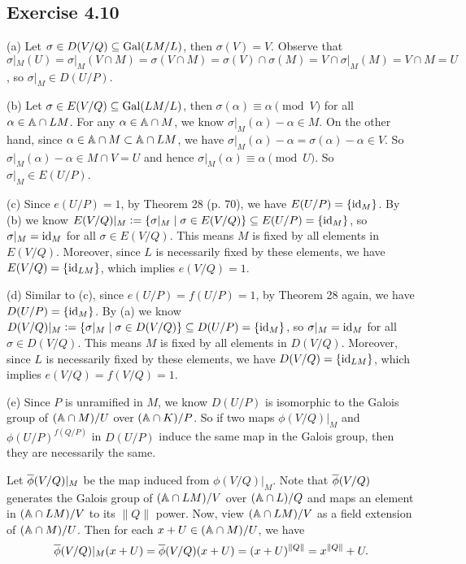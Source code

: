 \documentclass[../Marcus.tex]{subfiles}
\begin{document}
\subsection*{Exercise 4.10}

(a) Let $\sigma\in D(V/Q)\sbe\Gal(LM/L)$, then $\sigma(V)=V$. Observe that $\sigma|_M(U)=\sigma|_M(V\cap M)=\sigma(V\cap M)=\sigma(V)\cap\sigma(M)=V\cap\sigma|_M(M)=V\cap M=U$, so $\sigma|_M\in D(U/P)$.

(b) Let $\sigma\in E(V/Q)\sbe\Gal(LM/L)$, then $\sigma(\alpha)\equiv\alpha \pmod{V}$ for all $\alpha\in \AA \cap LM$. For any $\alpha\in \AA \cap M$, we know $\sigma|_M(\alpha)-\alpha\in M$. On the other hand, since $\alpha\in \AA \cap M \subset \AA \cap LM$, we have $\sigma|_M(\alpha)-\alpha=\sigma(\alpha)-\alpha\in V$. So $\sigma|_M(\alpha)-\alpha\in M\cap V=U$ and hence $\sigma|_M(\alpha)\equiv\alpha\pmod{U}$. So $\sigma|_M\in E(U/P)$.

(c) Since $e(U/P)=1$, by Theorem 28 (p. 70), we have $E(U/P)=\{\id_M\}$. By (b) we know $E(V/Q)|_M:=\{\sigma|_M \mid \sigma\in E(V/Q)\} \sbe E(U/P)=\{\id_M\}$, so $\sigma|_M=\id_M$ for all $\sigma\in E(V/Q)$. This means $M$ is fixed by all elements in $E(V/Q)$. Moreover, since $L$ is necessarily fixed by these elements, we have $E(V/Q)=\{\id_{LM}\}$, which implies $e(V/Q)=1$.

(d) Similar to (c), since $e(U/P)=f(U/P)=1$, by Theorem 28 again, we have $D(U/P)=\{\id_M\}$. By (a) we know $D(V/Q)|_M:=\{\sigma|_M \mid \sigma\in D(V/Q)\} \sbe D(U/P)=\{\id_M\}$, so $\sigma|_M=\id_M$ for all $\sigma\in D(V/Q)$. This means $M$ is fixed by all elements in $D(V/Q)$. Moreover, since $L$ is necessarily fixed by these elements, we have $D(V/Q)=\{\id_{LM}\}$, which implies $e(V/Q)=f(V/Q)=1$.

(e) Since $P$ is unramified in $M$, we know $D(U/P)$ is isomorphic to the Galois group of $(\AA \cap M)/U$ over $(\AA \cap K)/P$. So if two maps $\phi(V/Q)|_M$ and $\phi(U/P)^{f(Q/P)}$ in $D(U/P)$ induce the same map in the Galois group, then they are necessarily the same. 

Let $\ovl{\phi}(V/Q)|_M$ be the map induced from $\phi(V/Q)|_M$. Note that $\ovl{\phi}(V/Q)$ generates the Galois group of $(\AA \cap LM)/V$ over $(\AA \cap L)/Q$ and maps an element in $(\AA \cap LM)/V$ to its $\|Q\|$ power. Now, view $(\AA \cap LM)/V$ as a field extension of $(\AA \cap M)/U$. Then for each $x+U \in (\AA \cap M)/U$, we have
$$
\ovl{\phi}(V/Q)|_M(x+U)=\ovl{\phi}(V/Q)(x+U)=(x+U)^{\|Q\|}=x^{\|Q\|}+U.
$$
\end{document}
